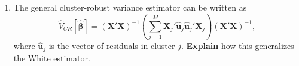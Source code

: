 \documentclass[12pt]{article}
\newcommand{\bs}{\boldsymbol}
\newcommand{\mb}{\mathbf}
\renewcommand{\u}{\ensuremath{\mb{u}}}
\newcommand{\X}{\ensuremath{\mb{X}}}
\renewcommand{\b}{\ensuremath{\bs{\beta}}}
\newcommand{\cov}{\mbox{Cov}}
\newcommand{\cor}{\mbox{Cor}}
\begin{document}
\begin{enumerate}
\begin{enumerate}
\item For units in \emph{different} clusters $j\neq k$, compute $\cov(\varepsilon_{ij},\varepsilon_{\ell k}).$

\clearpage
\item Using your answers above, write out the $6\times 6$ covariance matrix $\Sigma = V[\bm{\varepsilon}]$ for the given ordering
$(\varepsilon_{1,1},\varepsilon_{2,1},\varepsilon_{3,1},
\varepsilon_{4,2},\varepsilon_{5,2},\varepsilon_{6,2})'$.
\vspace{8em}

\item Compute the correlation $\cor(\varepsilon_{ij},\varepsilon_{\ell j})$
for $i\neq \ell$ in the same cluster $j$ and verify that it equals $\rho$.
\end{enumerate}

\clearpage


\item The general cluster-robust variance estimator can be written as  
\[
\widehat{V}_{CR}[\hat{\b}] = (\X'\X)^{-1}\left(\sum_{j=1}^M \X_j'\hat{\u}_j\hat{\u}_j'\X_j\right)(\X'\X)^{-1},
\]
where $\hat{\u}_j$ is the vector of residuals in cluster $j$.  
\textbf{Explain} how this generalizes the White estimator.




\end{enumerate}
\end{document}
